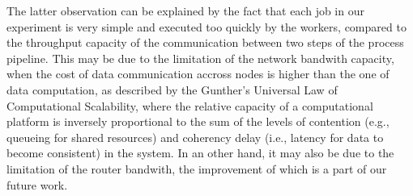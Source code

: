 The latter observation can be explained by the fact that each job in our experiment is very simple and executed too quickly by the workers, compared to the throughput capacity of the communication between two steps of the process pipeline.
This may be due to the limitation of the network bandwith capacity, when the cost of data communication accross nodes is higher than the one of data computation, as described by the Gunther's Universal Law of Computational Scalability\cite{gunther1993simple}, where the relative capacity of a computational platform is inversely proportional to the sum of the levels of contention (e.g., queueing for shared resources) and coherency delay (i.e., latency for data to become consistent) in the system.
In an other hand, it may also be due to the limitation of the router bandwith, the improvement of which is a part of our future work.

